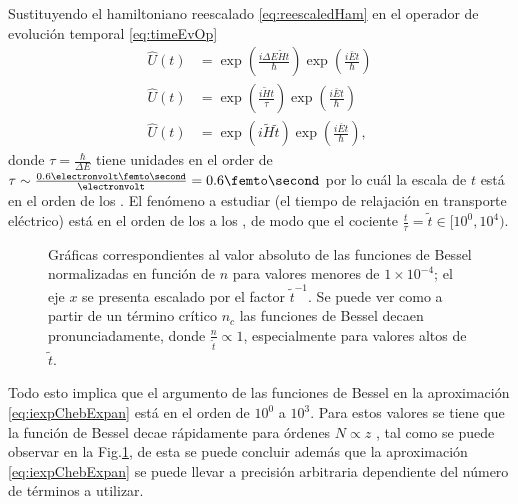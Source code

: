 Sustituyendo el hamiltoniano reescalado \eqref{eq:reescaledHam} en el operador de evolución temporal \eqref{eq:timeEvOp}
\begin{align*}
	\hat{U}(t) &= \exp({\frac{i\Delta E\tilde{H}t}\hbar}) \exp(\frac{i\bar E t}\hbar) \\
	\hat{U}(t) &= \exp({\frac{i\tilde{H}t}\tau}) \exp(\frac{i\bar E t}\hbar)\\
	\hat{U}(t) &= \exp(i\tilde{H}\tilde t) \exp(\frac{i\bar E t}\hbar),
\end{align*}
donde $\tau = \frac\hbar{\Delta E}$ tiene unidades en el order de 
$\tau \sim \frac{0.6 \electronvolt\femto\second}{\electronvolt} = 0.6\femto\second$ 
por lo cuál la escala de $t$ está en el orden de los \femto\second. El fenómeno a estudiar 
(el tiempo de relajación en transporte eléctrico) está en el orden de los 
\femto\second{} a los \pico\second{} \autocite{Fan2018}, de modo que el cociente 
$\frac{t}{\tau} = \tilde{t} \in [10^0, 10^4)$.

\iffalse
\begin{figure}[bth]
	\centering
	
	\caption{Gráficas de los polinomios de Chebyshev $J_n(t)$ para $N=1050$ términos. Se puede observar cómo los valores del polinomio decaen monotónicamente a partir de $n \approx t$ para cada valor de $t$.}
	\label{fig:gn_Jn(t)}
\end{figure}
\fi

\begin{figure}[htb]
	\centering
	
	\caption[Funciones de Bessel Normalizadas]{Gráficas correspondientes al valor absoluto de las funciones de Bessel normalizadas en función de $n$ para valores menores de $1\times10^{-4}$; el eje $x$ se presenta escalado por el factor $\tilde{t}^{-1}$. Se puede ver como a partir de un término crítico $n_c$ las funciones de Bessel decaen pronunciadamente, donde $\frac n{\tilde t} \propto 1$, especialmente para valores altos de $\tilde{t}$.}
	\label{fig:normJ_n(t)}
\end{figure}

Todo esto implica que el argumento de las funciones de Bessel en la aproximación \eqref{eq:iexpChebExpan} está en el 
orden de $10^0$ a $10^3$. Para estos valores se tiene que la función de Bessel decae rápidamente para órdenes $N \propto 
z$ \autocite{Fan2018}, tal como se puede observar en la Fig.\ref{fig:normJ_n(t)}, de esta se puede concluir además que la
aproximación \eqref{eq:iexpChebExpan} se puede llevar a precisión arbitraria dependiente del número de términos a
utilizar.

